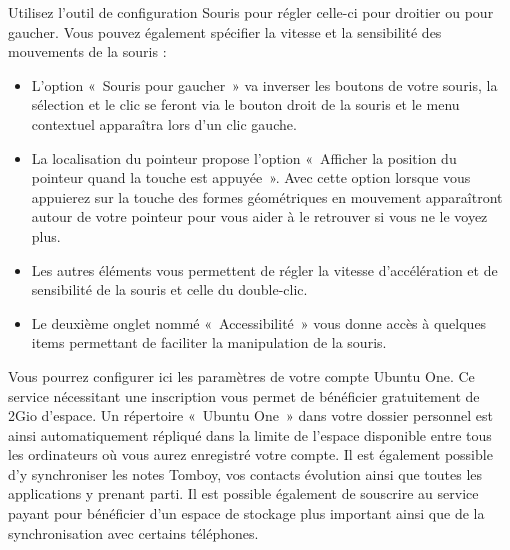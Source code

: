 Utilisez l'outil de configuration Souris pour régler celle-ci pour droitier ou pour gaucher. Vous pouvez également spécifier la vitesse et la sensibilité des mouvements de la souris :
\begin{itemize}
\item L'option «~Souris pour gaucher~» va inverser les boutons de votre souris, la sélection et le clic se feront via le bouton droit de la souris et le menu contextuel apparaîtra lors d'un clic gauche.
\item La localisation du pointeur propose l'option «~Afficher la position du pointeur quand la touche  est appuyée~». Avec cette option lorsque vous appuierez sur la touche  des formes géométriques en mouvement apparaîtront autour de votre pointeur pour vous aider à le retrouver si vous ne le voyez plus.
\item Les autres éléments vous permettent de régler la vitesse d'accélération et de sensibilité de la souris et celle du double-clic.
\item Le deuxième onglet nommé «~Accessibilité~» vous donne accès à quelques items permettant de faciliter la manipulation de la souris.
\end{itemize}
Vous pourrez configurer ici les paramètres de votre compte Ubuntu One. Ce service nécessitant une inscription vous permet de bénéficier gratuitement de 2Gio d'espace. Un répertoire «~Ubuntu One~» dans votre dossier personnel est ainsi automatiquement répliqué dans la limite de l'espace disponible entre tous les ordinateurs où vous aurez enregistré votre compte. Il est également possible d'y synchroniser les notes Tomboy, vos contacts évolution ainsi que toutes les applications y prenant parti. Il est possible également de souscrire au service payant pour bénéficier d'un espace de stockage plus important ainsi que de la synchronisation avec certains téléphones.
